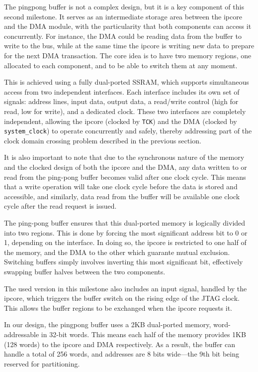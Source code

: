 \documentclass[a4paper,11pt,oneside]{report}
\begin{document}
The pingpong buffer is not a complex design, but it is a key component of this second milestone. 
It serves as an intermediate storage area between the ipcore and the DMA module, 
with the particularity that both components can access it concurrently. 
For instance, the DMA could be reading data from the buffer to write to the bus, 
while at the same time the ipcore is writing new data to prepare for the next DMA transaction. 
The core idea is to have two memory regions, one allocated to each component, and to be able to switch them at any moment. 

This is achieved using a fully dual-ported SSRAM, which supports simultaneous access from two independent interfaces. 
Each interface includes its own set of signals: address lines, input data, output data, a read/write control (high for read, low for write), and a dedicated clock. 
These two interfaces are completely independent, allowing the ipcore (clocked by \texttt{TCK}) 
and the DMA (clocked by \texttt{system\_clock}) to operate concurrently and safely, 
thereby addressing part of the clock domain crossing problem described in the previous section.

It is also important to note that due to the synchronous nature of the memory and the clocked design of both the ipcore and the DMA, 
any data written to or read from the ping-pong buffer becomes valid after one clock cycle. 
This means that a write operation will take one clock cycle before the data is stored and accessible, 
and similarly, data read from the buffer will be available one clock cycle after the read request is issued. 

The ping-pong buffer ensures that this dual-ported memory is logically divided into two regions. 
This is done by forcing the most significant address bit to 0 or 1, depending on the interface. 
In doing so, the ipcore is restricted to one half of the memory, 
and the DMA to the other which guarante mutual exclusion. 
Switching buffers simply involves inverting this most significant bit, effectively swapping buffer halves between the two components.

The used version in this milestone also includes an input signal, handled by the ipcore, 
which triggers the buffer switch on the rising edge of the JTAG clock. 
This allows the buffer regions to be exchanged when the ipcore requests it.

In our design, the pingpong buffer uses a 2KB dual-ported memory, word-addressable in 32-bit words. 
This means each half of the memory provides 1KB (128 words) to the ipcore and DMA respectively. 
As a result, the buffer can handle a total of 256 words, and addresses are 8 bits wide—the 9th bit being reserved for partitioning.
\end{document}
